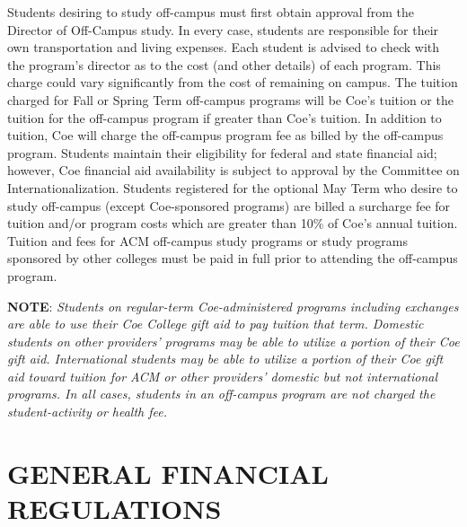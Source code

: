 \documentclass[
  letterpaper,
]{scrbook}
\begin{document}
Students desiring to study off-campus must first obtain approval from
the Director of Off-Campus study. In every case, students are
responsible for their own transportation and living expenses. Each
student is advised to check with the program's director as to the cost
(and other details) of each program. This charge could vary
significantly from the cost of remaining on campus. The tuition charged
for Fall or Spring Term off-campus programs will be Coe's tuition or the
tuition for the off-campus program if greater than Coe's tuition. In
addition to tuition, Coe will charge the off-campus program fee as
billed by the off-campus program. Students maintain their eligibility
for federal and state financial aid; however, Coe financial aid
availability is subject to approval by the Committee on
Internationalization. Students registered for the optional May Term who
desire to study off-campus (except Coe-sponsored programs) are billed a
surcharge fee for tuition and/or program costs which are greater than
10\% of Coe's annual tuition. Tuition and fees for ACM off-campus study
programs or study programs sponsored by other colleges must be paid in
full prior to attending the off-campus program.

\textbf{NOTE}: \emph{Students on regular-term Coe-administered programs
including exchanges are able to use their Coe College gift aid to pay
tuition that term. Domestic students on other providers' programs may be
able to utilize a portion of their Coe gift aid. International students
may be able to utilize a portion of their Coe gift aid toward tuition
for ACM or other providers' domestic but not international programs. In
all cases, students in an off-campus program are not charged the
student-activity or health fee.}

\section{GENERAL FINANCIAL
REGULATIONS}\label{general-financial-regulations}
\end{document}
